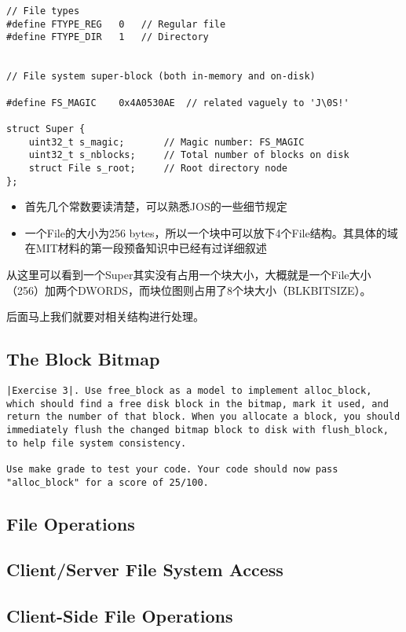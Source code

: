 \documentclass{article}
\begin{document}
\begin{CJK*}{UTF8}{gkai}
\begin{lstlisting}[style=ccode, title={\scriptsize \ttfamily \bfseries inc/fs.h}]
// File types
#define FTYPE_REG	0	// Regular file
#define FTYPE_DIR	1	// Directory


// File system super-block (both in-memory and on-disk)

#define FS_MAGIC	0x4A0530AE	// related vaguely to 'J\0S!'

struct Super {
	uint32_t s_magic;		// Magic number: FS_MAGIC
	uint32_t s_nblocks;		// Total number of blocks on disk
	struct File s_root;		// Root directory node
};
\end{lstlisting}

\begin{itemize}
\item{首先几个常数要读清楚，可以熟悉JOS的一些细节规定}
\item{一个File的大小为256 bytes，所以一个块中可以放下4个File结构。其具体的域在MIT材料的第一段预备知识中已经有过详细叙述}
\end{itemize}

从这里可以看到一个Super其实没有占用一个块大小，大概就是一个File大小（256）加两个DWORDS，而块位图则占用了8个块大小（BLKBITSIZE）。

后面马上我们就要对相关结构进行处理。

\subsection{The Block Bitmap}

\begin{lstlisting}[style=exercise]
|Exercise 3|. Use free_block as a model to implement alloc_block, which should find a free disk block in the bitmap, mark it used, and return the number of that block. When you allocate a block, you should immediately flush the changed bitmap block to disk with flush_block, to help file system consistency.

Use make grade to test your code. Your code should now pass "alloc_block" for a score of 25/100.
\end{lstlisting}

\subsection{File Operations}

\subsection{Client/Server File System Access}

\subsection{Client-Side File Operations}


\end{CJK*}
\end{document}
